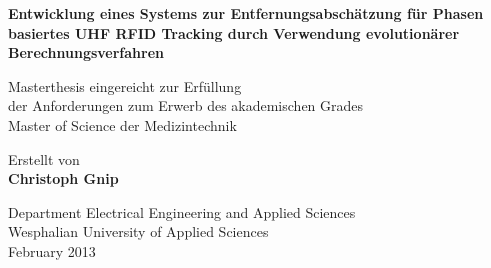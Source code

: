 
\begin{titlepage}
       \begin{center}
			{
			\Huge 
			\textbf{
			  Entwicklung eines Systems zur
			  Entfernungsabschätzung für Phasen basiertes UHF RFID Tracking durch Verwendung
			  evolutionärer Berechnungsverfahren
			}\par
			}
			\vspace{3cm}
			{
			\Large Masterthesis eingereicht zur Erfüllung\\
			der Anforderungen zum Erwerb des akademischen Grades\\
			Master of Science der Medizintechnik\\
			}
\vspace{2cm}

\large{Erstellt von}\\

\Large{\textbf{Christoph Gnip}}


\vfill

{\normalsize Department Electrical Engineering and Applied Sciences
           \\Wesphalian University of Applied Sciences\\[2ex]February 2013}


       \end{center}
   \end{titlepage}

\newpage
{}
\thispagestyle{empty}
\hspace{1cm}

\newpage
\normalsize


